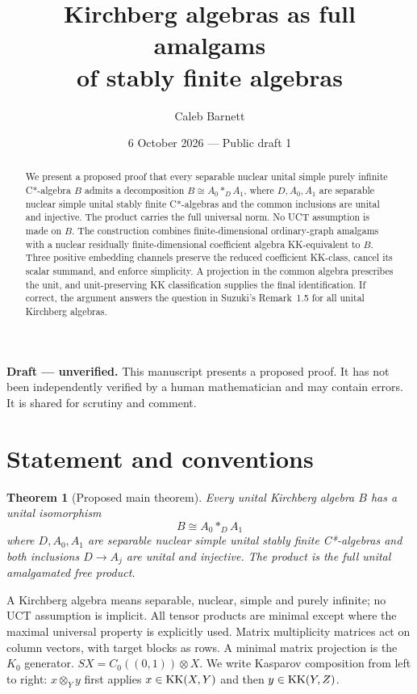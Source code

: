 \documentclass[11pt]{article}
\title{Kirchberg algebras as full amalgams\\
of stably finite algebras}
\author{Caleb Barnett}
\date{6 October 2026 --- Public draft 1}
\newtheorem{theorem}{Theorem}
\theoremstyle{remark}\newtheorem{remark}[theorem]{Remark}
\begin{document}
\maketitle\thispagestyle{fancy}
\begin{center}
\begin{minipage}{0.92\textwidth}
\small\textbf{Draft --- unverified.} This manuscript presents a proposed
proof. It has not been independently verified by a human mathematician
and may contain errors. It is shared for scrutiny and comment.
\end{minipage}
\end{center}
\begin{abstract}
We present a proposed proof that every separable nuclear unital simple
purely infinite C*-algebra $B$ admits a decomposition
$B\cong A_0*_D A_1$, where $D,A_0,A_1$ are separable nuclear simple
unital stably finite C*-algebras and the common inclusions are unital
and injective. The product carries the full universal norm. No UCT
assumption is made on $B$. The construction combines finite-dimensional
ordinary-graph amalgams with a nuclear residually finite-dimensional
coefficient algebra KK-equivalent to $B$. Three positive embedding
channels preserve the reduced coefficient KK-class, cancel its scalar
summand, and enforce simplicity. A projection in the common algebra
prescribes the unit, and unit-preserving KK classification supplies the
final identification. If correct, the argument answers the question in
Suzuki's Remark~1.5 for all unital Kirchberg algebras.
\end{abstract}
\section{Statement and conventions}
\begin{theorem}[Proposed main theorem]\label{thm:all}
Every unital Kirchberg algebra $B$ has a unital isomorphism
\[
                     B\cong A_0*_D A_1
\]
where $D,A_0,A_1$ are separable nuclear simple unital stably finite
C*-algebras and both inclusions $D\to A_j$ are unital and injective.
The product is the full unital amalgamated free product.
\end{theorem}
A Kirchberg algebra means separable, nuclear, simple and purely infinite;
no UCT assumption is implicit. All tensor products are minimal except
where the maximal universal property is explicitly used. Matrix
multiplicity matrices act on column vectors, with target blocks as rows.
A minimal matrix projection is the $K_0$ generator. $SX=C_0((0,1))\otimes X$.
We write Kasparov composition from left to right: $x\otimes_Y y$ first
applies $x\in\operatorname{KK}(X,Y)$ and then $y\in\operatorname{KK}(Y,Z)$.
\end{document}
